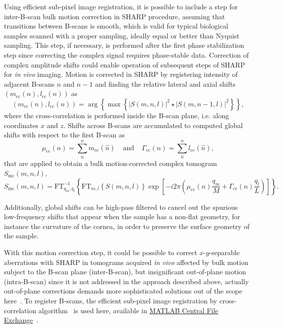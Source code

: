 Using efficient sub-pixel image registration, it is possible to include a step for inter-B-scan bulk motion correction in SHARP procedure, assuming that transitions between B-scans is smooth, which is valid for typical biological samples scanned with a proper sampling, ideally equal or better than Nyquist sampling. This step, if necessary, is performed after the first phase stabilization step since correcting the complex signal requires phase-stable data. Correction of complex amplitude shifts could enable operation of subsequent steps of SHARP for \textit{in vivo} imaging. Motion is corrected in SHARP by registering intensity of adjacent B-scans $n$ and $n-1$ and finding the relative lateral and axial shifts $(m_\text{cc}(n), l_\text{cc}(n))$ as
\begin{equation}
    (m_\text{cc}(n), l_\text{cc}(n)) = \arg\left\{\max\left\{ |S(m,n,l)|^2\star |S(m,n-1,l)|^2 \right\}\right\},
\end{equation}
where the cross-correlation is performed inside the B-scan plane, i.e. along coordinates $x$ and $z$. Shifts across B-scans are accumulated to computed global shifts with respect to the first B-scan as
\begin{equation}
    \mu_{\text{cc}}(n) = \sum_{\hat{n}}^n m_{\text{cc}}(\hat{n}) \ \ \ \ \ \text{and} \ \ \ \ \  \Gamma_{\text{cc}}(n) = \sum_{\hat{n}}^n l_{\text{cc}}(\hat{n}),
\end{equation}
that are applied to obtain a bulk motion-corrected complex tomogram $S_\text{mc}(m,n,l)$,
\begin{equation}
    S_\text{mc}(m,n,l) = \text{FT}^{-1}_{q_m,q_l}\left\{\text{FT}_{m,l}\left\{S(m,n,l)\right\} \exp\left[-i2\pi\left( \mu_{\text{cc}}(n)\frac{q_m}{M} + \Gamma_{\text{cc}}(n)\frac{q_l}{L}\right)\right]\right\}.
\end{equation}

Additionally, global shifts can be high-pass filtered to cancel out the spurious low-frequency shifts that appear when the sample has a non-flat geometry, for instance the curvature of the cornea, in order to preserve the surface geometry of the sample.

With this motion correction step, it could be possible to correct $x$-$y$-separable aberrations with SHARP in tomograms acquired \textit{in vivo} affected by bulk motion subject to the B-scan plane (inter-B-scan), but insignificant out-of-plane motion (intra-B-scan) since it is not addressed in the approach described above, actually out-of-plane corrections demands more sophisticated solutions out of the scope here~\cite{Kraus2012_Motion}. To register B-scans, the efficient sub-pixel image registration by cross-correlation algorithm~\cite{Guizar-Sicairos2008_Efficient} is used here, available in \href{https://www.mathworks.com/matlabcentral/fileexchange/18401-efficient-subpixel-image-registration-by-cross-correlation}{MATLAB Central File Exchange}~\cite{Guizar2020_Efficient}.

